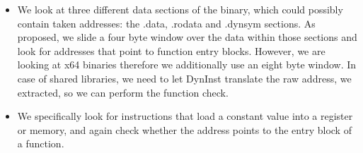 \begin{itemize}
\item We look at three different data sections of the binary, which could possibly contain taken addresses: the .data, .rodata and .dynsym
sections. As \cite{mingwei:sekar} proposed, we slide a four byte window over the data within those sections and look for addresses that
point to function entry blocks. However, we are looking at x64 binaries therefore we additionally use an eight byte window. In case of 
shared libraries, we need to let DynInst translate the raw address, we extracted, so we can perform the function check.

\item We specifically look for instructions that load a constant value into a register or memory, and again check whether the address 
points to the entry block of a function.
\end{itemize}

%
%


